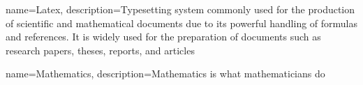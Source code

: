 

{
    name=Latex,
    description={Typesetting system commonly used for the production of scientific and mathematical documents due to its powerful handling of formulas and references. It is widely used for the preparation of documents such as research papers, theses, reports, and articles}
}

{
    name=Mathematics,
    description={Mathematics is what mathematicians do}
}
